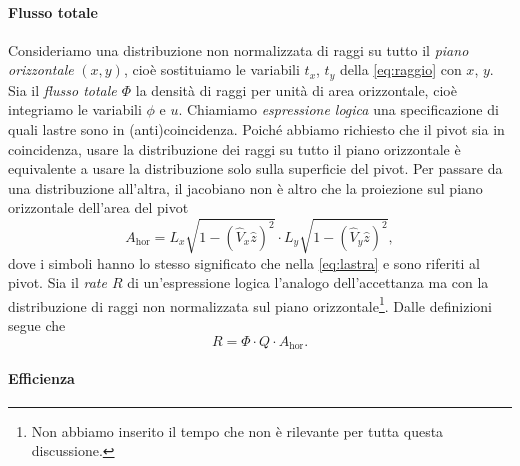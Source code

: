\paragraph{Flusso totale}

Consideriamo una distribuzione non normalizzata di raggi su tutto il \emph{piano orizzontale} $(x,y)$,
cioè sostituiamo le variabili $t_x$, $t_y$ della \eqref{eq:raggio} con $x$, $y$.
Sia il \emph{flusso totale $\Phi$} la densità di raggi per unità di area orizzontale,
cioè integriamo le variabili $\phi$ e $u$.
Chiamiamo \emph{espressione logica} una specificazione di quali lastre sono in (anti)coincidenza.
Poiché abbiamo richiesto che il pivot sia in coincidenza,
usare la distribuzione dei raggi su tutto il piano orizzontale è equivalente
a usare la distribuzione solo sulla superficie del pivot.
Per passare da una distribuzione all'altra,
il jacobiano non è altro che la proiezione sul piano orizzontale dell'area del pivot
\begin{equation*}
	A_\text{hor} = L_x \sqrt{1-(\hat V_x\hat z)^2} \cdot L_y \sqrt{1-(\hat V_y\hat z)^2},
\end{equation*}
dove i simboli hanno lo stesso significato che nella \eqref{eq:lastra}
e sono riferiti al pivot.
Sia il \emph{rate $R$} di un'espressione logica l'analogo dell'accettanza
ma con la distribuzione di raggi non normalizzata sul piano orizzontale\footnote{Non abbiamo inserito il tempo che non è rilevante per tutta questa discussione.}.
Dalle definizioni segue che
\begin{equation}
	\label{eq:rate}
	R = \Phi \cdot Q \cdot A_\text{hor}.
\end{equation}

\paragraph{Efficienza}

